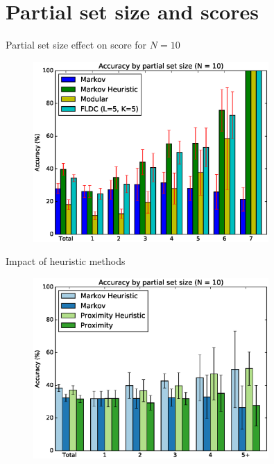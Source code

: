 \documentclass{beamer}
\begin{document}
\section{Partial set size and scores}

\begin{frame}{Partial set size effect on score for $N=10$}
  \begin{figure}
    \centering
    \includegraphics[width=0.8\textwidth]{set_size_score_10}
  \end{figure}
\end{frame}

\begin{frame}{Impact of heuristic methods}
  \begin{figure}
    \centering
    \includegraphics[width=0.8\textwidth]{set_size_score_10_heuristic_comparison}
  \end{figure}
\end{frame}
\end{document}
